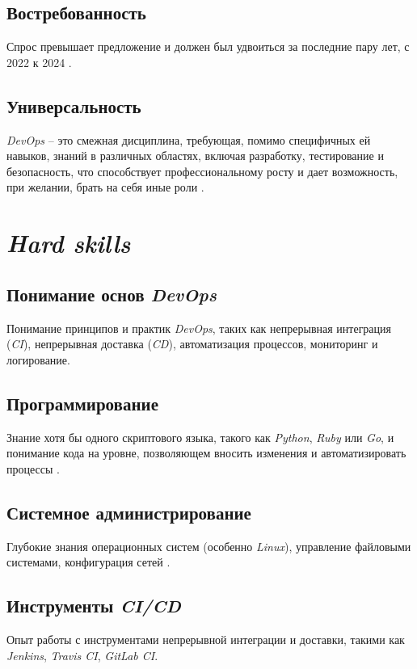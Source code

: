 \documentclass[variant=practice]{bsuir}
\begin{document}
\subsection{Востребованность} Спрос превышает предложение и должен был удвоиться
за последние пару лет, с 2022 к 2024 \cite{devops-mts}.

\subsection{Универсальность} \textit{DevOps} -- это смежная дисциплина,
требующая, помимо специфичных ей навыков, знаний в различных областях, включая
разработку, тестирование и безопасность, что способствует профессиональному
росту и дает возможность, при желании, брать на себя иные роли
\cite{devops-mts}.

\section{\textit{Hard skills}}

\subsection{Понимание основ \textit{DevOps}} Понимание принципов и практик
\textit{DevOps}, таких как непрерывная интеграция (\textit{CI}), непрерывная
доставка (\textit{CD}), автоматизация процессов, мониторинг и логирование.

\subsection{Программирование} Знание хотя бы одного скриптового языка, такого
как \textit{Python}, \textit{Ruby} или \textit{Go}, и понимание кода на
уровне, позволяющем вносить изменения и автоматизировать процессы
\cite{devops-mts}.

\subsection{Системное администрирование} Глубокие знания операционных систем
(особенно \textit{Linux}), управление файловыми системами, конфигурация сетей
\cite{devops-mts}.

\subsection{Инструменты \textit{CI/CD}} Опыт работы с инструментами непрерывной
интеграции и доставки, такими как \textit{Jenkins}, \textit{Travis CI},
\textit{GitLab CI}.
\end{document}
